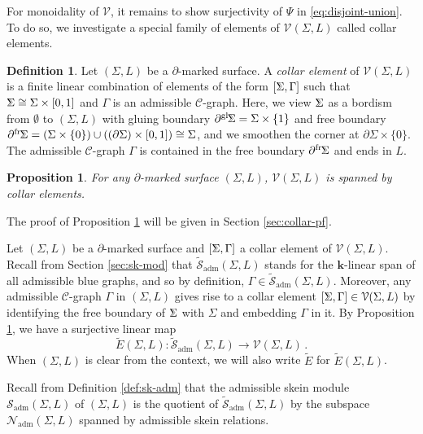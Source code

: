 \documentclass[11pt]{amsart}
\newtheorem{prop}[thm]{Proposition}
\theoremstyle{definition}
\newtheorem{definition}[thm]{Definition}
\numberwithin{equation}{section}
\def\bd{{\partial}}
\def\adm{\operatorname{adm}}
\newcommand{\bdf}[1]{{\bd^{\operatorname{fr}}\hspace{-1pt}{#1}}}
\newcommand{\bdg}[1]{{\bd^{\operatorname{gl}}\hspace{-1pt}{#1}}}
\def\ourV{\cV}
\def\sk{\cS}
\newcommand{\bbSigma}{%
  \mathord{
    \tikz[baseline=(char.base)]{
      \node[inner sep=0pt] (char) {$\Sigma$}; %
\begin{scope}[xshift=0.5]
      \draw[line width=0.3pt] (-0.05,0.115)--(0.03,0.002);
      \draw[line width=0.3pt] (-0.06,-0.115)--(0.035,0.004);
\end{scope}
    }
  }
}
\def\cC{\mathcal{C}}
\def\cN{\mathcal{N}}
\def\cS{\mathcal{S}}
\def\cV{\mathcal{V}}
\def\kk{{\bm{k}}}
\def\to{\rightarrow}
\begin{document}
For monoidality of $\ourV$, it remains to show surjectivity of $\Psi$ in \eqref{eq:disjoint-union}. To do so, we investigate a special family of elements of $\ourV(\Sigma, L)$ called collar elements.


\begin{definition}\label{def:collar}
Let $(\Sigma, L)$ be a $\bd$-marked surface. A \emph{collar element} of $\ourV(\Sigma, L)$ is a finite linear combination of elements of the form $[\bbSigma, \Gamma]$ such that $\bbSigma \cong \Sigma\times [0,1]$ and $\Gamma$ is an admissible $\cC$-graph. Here, we view $\bbSigma$ as a bordism from $\emptyset$ to $(\Sigma, L)$ with gluing boundary $\bdg\bbSigma = \Sigma\times\{1\}$ and free boundary $\bdf\bbSigma = (\Sigma\times\{0\}) \cup ((\bd\Sigma)\times[0,1])  \cong \Sigma$, and we smoothen the corner at $\bd\Sigma\times\{0\}$. The admissible $\cC$-graph $\Gamma$ is contained in the free boundary $\bdf\bbSigma$ and ends in $L$.
\end{definition}

\begin{prop}\label{prop:collar}
For any $\bd$-marked surface $(\Sigma, L)$, $\ourV(\Sigma, L)$ is spanned by collar elements.
\end{prop}

The proof of Proposition \ref{prop:collar} will be given in Section \ref{sec:collar-pf}.

\medskip

Let $(\Sigma, L)$ be a $\bd$-marked surface and $[\bbSigma, \Gamma]$ a collar element of $\ourV(\Sigma, L)$. Recall from Section \ref{sec:sk-mod} that $\tilde{\sk}_{\adm}(\Sigma,L)$ stands for the $\kk$-linear span of all admissible blue graphs, and so by definition, $\Gamma \in \tilde{\sk}_{\adm}(\Sigma, L)$. Moreover, any admissible $\cC$-graph $\Gamma$ in $(\Sigma, L)$ gives rise to a collar element $[\bbSigma, \Gamma] \in \ourV(\Sigma, L)$ by identifying the free boundary of $\bbSigma$ with $\Sigma$ and embedding $\Gamma$ in it. By Proposition \ref{prop:collar}, we have a surjective linear map 
\begin{equation}\label{eq:T-tilde}
\tilde{E}(\Sigma, L): \tilde{\sk}_{\adm}(\Sigma,L) \to \ourV(\Sigma, L)\,.
\end{equation}
When $(\Sigma, L)$ is clear from the context, we will also write $\tilde{E}$ for $\tilde{E}(\Sigma, L)$.

Recall from Definition \ref{def:sk-adm} that the admissible skein module $\sk_{\adm}(\Sigma, L)$ of $(\Sigma, L)$ is the quotient of $\tilde{\sk}_{\adm}(\Sigma, L)$ by the subspace $\cN_{\adm}(\Sigma, L)$ spanned by admissible skein relations.
\end{document}
